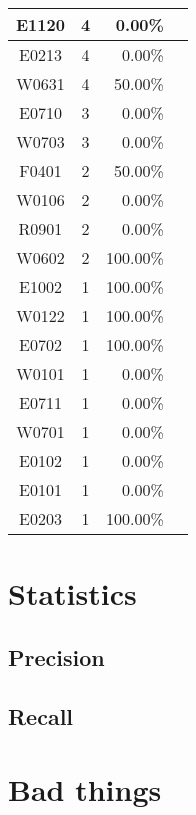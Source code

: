 \documentclass[11pt, a4paper]{article}
\begin{document}
\begin{longtable}{|c|c|r|m{9.2cm}|}
\hline
E1120 & 4 & 0.00\% &  \\
\hline
E0213 & 4 & 0.00\% &  \\
\hline
W0631 & 4 & 50.00\% &  \\
\hline
E0710 & 3 & 0.00\% &  \\
\hline
W0703 & 3 & 0.00\% &  \\
\hline
F0401 & 2 & 50.00\% &  \\
\hline
W0106 & 2 & 0.00\% &  \\
\hline
R0901 & 2 & 0.00\% &  \\
\hline
W0602 & 2 & 100.00\% &  \\
\hline
E1002 & 1 & 100.00\% &  \\
\hline
W0122 & 1 & 100.00\% &  \\
\hline
E0702 & 1 & 100.00\% &  \\
\hline
W0101 & 1 & 0.00\% &  \\
\hline
E0711 & 1 & 0.00\% &  \\
\hline
W0701 & 1 & 0.00\% &  \\
\hline
E0102 & 1 & 0.00\% &  \\
\hline
E0101 & 1 & 0.00\% &  \\
\hline
E0203 & 1 & 100.00\% &  \\
\hline
\end{longtable}


\section{Statistics}

\subsection*{Precision}


\subsection*{Recall}


\section{Bad things}
\end{document}

